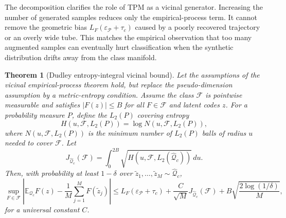 \documentclass[preprint,12pt,number]{elsarticle}
\newtheorem{theorem}{Theorem}
\begin{document}
The decomposition clarifies the role of TPM as a vicinal generator. Increasing the number of generated samples reduces only the empirical-process term. It cannot remove the geometric bias $L_F(\varepsilon_{\mathcal{P}}+\tau_c)$ caused by a poorly recovered trajectory or an overly wide tube. This matches the empirical observation that too many augmented samples can eventually hurt classification when the synthetic distribution drifts away from the class manifold.

\begin{theorem}[Dudley entropy-integral vicinal bound]
	Let the assumptions of the vicinal empirical-process theorem hold, but replace the pseudo-dimension assumption by a metric-entropy condition. Assume the class $\mathcal{F}$ is pointwise measurable and satisfies $|F(z)|\le B$ for all $F\in\mathcal{F}$ and latent codes $z$. For a probability measure $P$, define the $L_2(P)$ covering entropy
	\[
		H(u,\mathcal{F},L_2(P))=\log N(u,\mathcal{F},L_2(P)),
	\]
	where $N(u,\mathcal{F},L_2(P))$ is the minimum number of $L_2(P)$ balls of radius $u$ needed to cover $\mathcal{F}$. Let
	\[
		J_{\widehat{\mathcal{Q}}_c}(\mathcal{F})
		=
		\int_{0}^{2B}
		\sqrt{H(u,\mathcal{F},L_2(\widehat{\mathcal{Q}}_c))}\,du.
	\]
	Then, with probability at least $1-\delta$ over $\tilde z_1,\ldots,\tilde z_M\sim \widehat{\mathcal{Q}}_c$,
	\[
	\sup_{F\in\mathcal{F}}
	\left|
	\mathbb{E}_{\mathcal{Q}_c}F(z)-
	\frac{1}{M}\sum_{j=1}^{M}F(\tilde z_j)
	\right|
	\le
	L_F(\varepsilon_{\mathcal{P}}+\tau_c)
	+
	\frac{C}{\sqrt{M}}J_{\widehat{\mathcal{Q}}_c}(\mathcal{F})
	+
	B\sqrt{\frac{2\log(1/\delta)}{M}},
	\]
	for a universal constant $C$.
\end{theorem}
\end{document}
